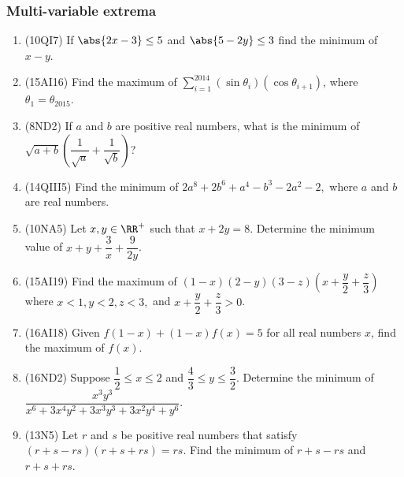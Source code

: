 \documentclass[10pt,paper=letter]{scrartcl}
\begin{document}
\subsubsection*{Multi-variable extrema}

\begin{enumerate}

\item (10QI7) If $\abs{2x-3} \leq 5$ and $\abs{5-2y} \leq 3$ find the minimum of $x - y$.

\item (15AI16) Find the maximum of $\displaystyle \sum_{i=1}^{2014} (\sin \theta_i)(\cos \theta_{i+1})$, where $\theta_1 = \theta_{2015}$.

\item (8ND2) If $a$ and $b$ are positive real numbers, what is the minimum of $\sqrt{a+b}\left(\dfrac{1}{\sqrt{a}}+ \dfrac{1}{\sqrt{b}}\right)$?

\item (14QIII5) Find the minimum of $2a^8 + 2b^6 + a^4 - b^3 - 2a^2 - 2,$ where $a$ and $b$ are real numbers.

\item (10NA5) Let $x, y \in \RR^+$ such that $x + 2y = 8$. Determine the minimum value of $x + y + \dfrac{3}{x} + \dfrac{9}{2y}$.

\item (15AI19) Find the maximum of $(1-x)(2-y)(3-z)\left(x+\dfrac{y}{2}+\dfrac{z}{3}\right)$ where $x < 1, y < 2, z < 3,$ and $x + \dfrac{y}{2} + \dfrac{z}{3} > 0$.

\item (16AI18) Given $f(1-x) + (1-x)f(x) = 5$ for all real numbers $x$, find the maximum of $f(x)$.

\item (16ND2) Suppose $\dfrac{1}{2} \leq x \leq 2$ and $\dfrac{4}{3} \leq y \leq \dfrac{3}{2}$. Determine the minimum of $\dfrac{x^3y^3}{x^6 + 3x^4y^2 + 3x^3y^3 + 3x^2y^4 + y^6}.$

\item (13N5) Let $r$ and $s$ be positive real numbers that satisfy $(r+s-rs)(r+s+rs)=rs$. Find the minimum of $r+s-rs$ and $r+s+rs$.

\end{enumerate}
\end{document}
